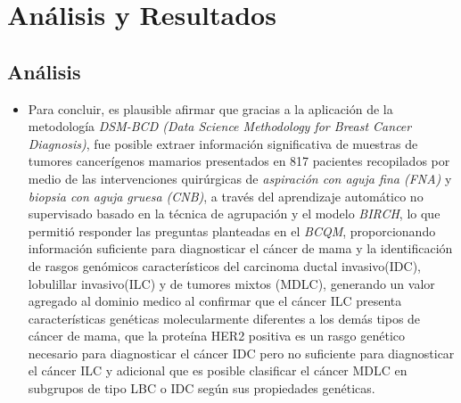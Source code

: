\chapter{Análisis y Resultados}

\section{Análisis}
\begin{itemize}[label=\HandPencilLeft]
	\item Para concluir, es plausible afirmar que gracias a la aplicación de la metodología \textit{DSM-BCD (Data Science Methodology for Breast Cancer Diagnosis)}, fue posible extraer información significativa de muestras de tumores cancerígenos mamarios presentados en 817 pacientes recopilados por medio de las intervenciones quirúrgicas de \textit{aspiración con aguja fina (FNA)} y \textit{biopsia con aguja gruesa (CNB)}, a través del aprendizaje automático no supervisado basado en la técnica de agrupación y el modelo \textit{BIRCH}, lo que permitió responder las preguntas planteadas en el \textit{BCQM}, proporcionando información suficiente para diagnosticar el cáncer de mama y la identificación de  rasgos genómicos característicos del carcinoma ductal invasivo(IDC), lobulillar invasivo(ILC) y de tumores mixtos (MDLC), generando un valor agregado al dominio medico al confirmar que el cáncer ILC presenta características genéticas molecularmente diferentes a los demás tipos de cáncer de mama, que  la proteína HER2 positiva es un rasgo genético necesario para diagnosticar el cáncer IDC pero no suficiente para diagnosticar el cáncer ILC y adicional que es posible clasificar el cáncer MDLC en subgrupos de tipo LBC o IDC según sus propiedades genéticas.
\end{itemize}

\newpage
